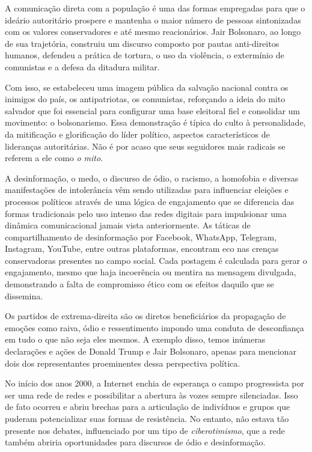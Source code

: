A comunicação direta com a população é uma das formas empregadas para
que o ideário autoritário prospere e mantenha o maior número de pessoas
sintonizadas com os valores conservadores e até mesmo reacionários. Jair
Bolsonaro, ao longo de sua trajetória, construiu um discurso composto
por pautas anti-direitos humanos, defendeu a prática de tortura, o uso
da violência, o extermínio de comunistas e a defesa da ditadura militar.

Com isso, se estabeleceu uma imagem pública da salvação nacional contra os
inimigos do país, os antipatriotas, os comunistas, reforçando a ideia do
mito salvador que foi essencial para configurar uma base eleitoral fiel
e consolidar um movimento: o bolsonarismo. Essa demonstração é típica do
culto à personalidade, da mitificação e glorificação do líder
político, aspectos característicos de lideranças autoritárias. Não é por
acaso que seus seguidores mais radicais se referem a ele como \textit{o
mito}.

A desinformação, o medo, o discurso de ódio, o racismo, a homofobia e
diversas manifestações de intolerância vêm sendo utilizadas para
influenciar eleições e processos políticos através de uma lógica de
engajamento que se diferencia das formas tradicionais pelo uso intenso
das redes digitais para impulsionar uma dinâmica comunicacional jamais
vista anteriormente. As táticas de compartilhamento de desinformação por
Facebook, WhatsApp, Telegram, Instagram, YouTube, entre outras
plataformas, encontram eco nas crenças conservadoras presentes no campo
social. Cada postagem é calculada para gerar o engajamento, mesmo que
haja incoerência ou mentira na mensagem divulgada, demonstrando a falta
de compromisso ético com os efeitos daquilo que se dissemina.

Os partidos de extrema-direita são os diretos beneficiários da
propagação de emoções como raiva, ódio e ressentimento impondo uma
conduta de desconfiança em tudo o que não seja eles mesmos. A exemplo
disso, temos inúmeras declarações e ações de Donald Trump e Jair
Bolsonaro, apenas para mencionar dois dos representantes proeminentes
dessa perspectiva política.

No início dos anos 2000, a Internet enchia de esperança o campo
progressista por ser uma rede de redes e possibilitar a abertura às
vozes sempre silenciadas. Isso de fato ocorreu e abriu brechas para a
articulação de indivíduos e grupos que puderam potencializar suas formas
de resistência. No entanto, não estava tão presente nos debates,
influenciado por um tipo de \textit{ciberotimismo}, que a rede também abriria
oportunidades para discursos de ódio e desinformação.

